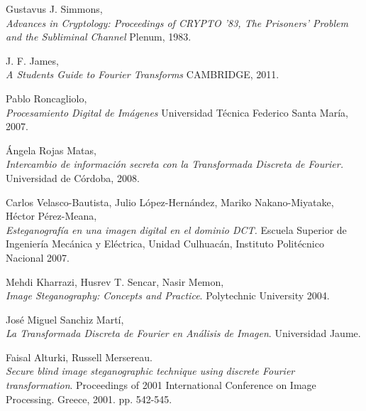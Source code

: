 \documentclass[a4paper]{article}
\begin{document}
\begin{thebibliography}{9}


  Gustavus J. Simmons,\\
  \emph{Advances in Cryptology: Proceedings of CRYPTO '83, The Prisoners' Problem and the Subliminal Channel}
  Plenum,
  1983.
  
  J. F. James,\\
  \emph{A Students Guide to Fourier Transforms}
  CAMBRIDGE,
  2011.  
  
  Pablo Roncagliolo,\\
  \emph{Procesamiento Digital de Imágenes}
  Universidad Técnica Federico Santa María,
  2007.  

  Ángela Rojas Matas,\\
  \emph{Intercambio de información secreta con la Transformada Discreta de Fourier.}
  Universidad de Córdoba,
  2008.
  

  Carlos Velasco-Bautista, Julio López-Hernández, Mariko Nakano-Miyatake, Héctor Pérez-Meana,\\
  \emph{Esteganografía en una imagen digital en el dominio DCT.}
  Escuela Superior de Ingeniería Mecánica y Eléctrica, Unidad Culhuacán, Instituto Politécnico Nacional
  2007.
    

  Mehdi Kharrazi, Husrev T. Sencar, Nasir Memon,\\
  \emph{Image Steganography: Concepts and Practice}.
  Polytechnic University
  2004.
    
  José Miguel Sanchiz Martí,\\
  \emph{La Transformada Discreta de Fourier en Análisis de Imagen}.
  Universidad Jaume.
  

  Faisal Alturki, Russell Mersereau.\\
  \emph{Secure blind image steganographic technique using discrete Fourier transformation}.
  Proceedings of 2001 International Conference on Image Processing.
  Greece, 2001. pp. 542-545.  
   
\end{thebibliography}
\end{document}
